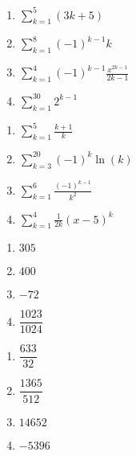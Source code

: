 \begin{multicols}{4} 
\begin{enumerate}
\setcounter{enumi}{\value{HW}}

\item $\displaystyle \sum_{k = 1}^{5} (3k + 5)$
\item $\displaystyle \sum_{k = 1}^{8} (-1)^{k - 1}k$
\item $\displaystyle \sum_{k = 1}^{4} (-1)^{k - 1} \frac{x^{2k - 1}}{2k - 1}$
\item $\displaystyle \sum_{k = 1}^{30} 2^{k-1}$

\setcounter{HW}{\value{enumi}}
\end{enumerate}
\end{multicols}


\begin{multicols}{4} 
\begin{enumerate}
\setcounter{enumi}{\value{HW}}


\item $\displaystyle \sum_{k = 1}^{5} \frac{k + 1}{k}$
\item $\displaystyle \sum_{k = 3}^{20} (-1)^{k} \ln(k)$
\item $\displaystyle \sum_{k = 1}^{6} \frac{(-1)^{k - 1}}{k^{2}}$
\item $\displaystyle \sum_{k = 1}^{4} \frac{1}{2k}(x - 5)^{k}$

\setcounter{HW}{\value{enumi}}
\end{enumerate}
\end{multicols}


\begin{multicols}{4} 
\begin{enumerate}
\setcounter{enumi}{\value{HW}}

\item $305$

\item  $400$

\item  $-72$

\item $\dfrac{1023}{1024}$

\setcounter{HW}{\value{enumi}}
\end{enumerate}
\end{multicols}

\begin{multicols}{4}
\begin{enumerate}
\setcounter{enumi}{\value{HW}}

\item $\dfrac{633}{32}$

\item $\dfrac{1365}{512}$

\item  $14652$

\item  $-5396$

\setcounter{HW}{\value{enumi}}
\end{enumerate}
\end{multicols}

